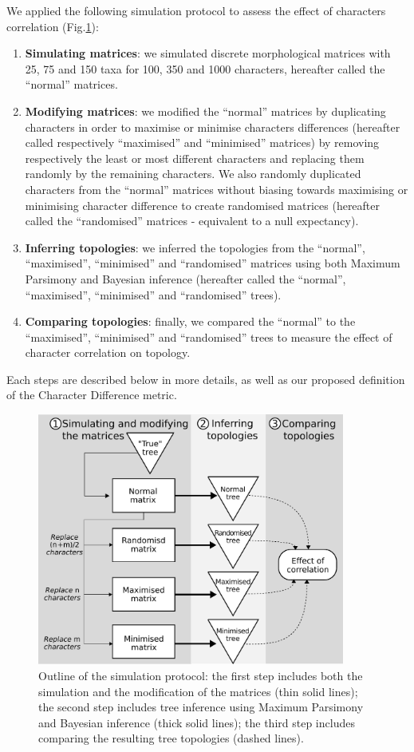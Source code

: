\documentclass[12pt,letterpaper]{article}
\begin{document}
We applied the following simulation protocol to assess the effect of characters correlation (Fig.\ref{Fig:outline}):
\begin{enumerate}
    \item \textbf{Simulating matrices}: we simulated discrete morphological matrices with 25, 75 and 150 taxa for 100, 350 and 1000 characters, hereafter called the ``normal'' matrices.
    \item \textbf{Modifying matrices}: we modified the ``normal'' matrices by duplicating characters in order to maximise or minimise characters differences (hereafter called respectively ``maximised'' and ``minimised'' matrices) by removing respectively the least or most different characters and replacing them randomly by the remaining characters.
    We also randomly duplicated characters from the ``normal'' matrices without biasing towards maximising or minimising character difference to create randomised matrices (hereafter called the ``randomised'' matrices - equivalent to a null expectancy).
    \item \textbf{Inferring topologies}: we inferred the topologies from the ``normal'', ``maximised'', ``minimised'' and ``randomised'' matrices using both Maximum Parsimony and Bayesian inference (hereafter called the ``normal'', ``maximised'', ``minimised'' and ``randomised'' trees).
    \item \textbf{Comparing topologies}: finally, we compared the ``normal'' to the ``maximised'', ``minimised'' and ``randomised'' trees to measure the effect of character correlation on topology.
\end{enumerate}
Each steps are described below in more details, as well as our proposed definition of the Character Difference metric.

\begin{figure}[!htbp]
\centering
   \includegraphics[width=0.9\textwidth]{Figures/outline.pdf}
\caption{Outline of the simulation protocol: the first step includes both the simulation and the modification of the matrices (thin solid lines); the second step includes tree inference using Maximum Parsimony and Bayesian inference (thick solid lines); the third step includes comparing the resulting tree topologies (dashed lines).}
\label{Fig:outline}
\end{figure}
\end{document}
